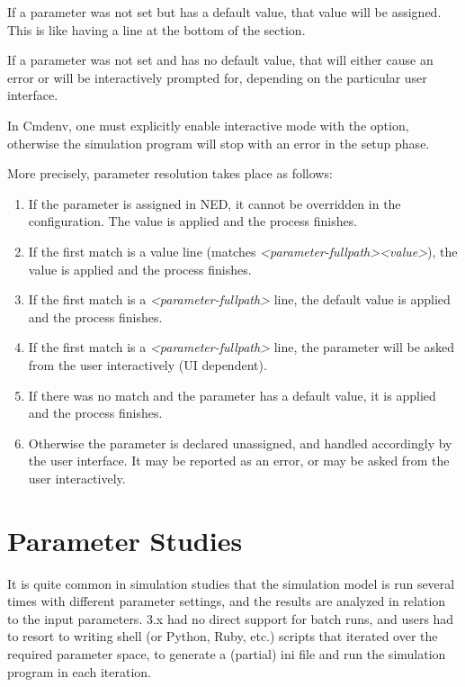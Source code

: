 If a parameter was not set but has a default value, that value will be
assigned. This is like having a  line at the
bottom of the \ttt{[General]} section.

If a parameter was not set and has no default value, that will either
cause an error or will be interactively prompted for, depending
on the particular user interface.

\begin{note}
In Cmdenv, one must explicitly enable interactive mode with the
 option, otherwise the simulation
program will stop with an error in the setup phase.
\end{note}

More precisely, parameter resolution takes place as follows:

\begin{enumerate}
\item If the parameter is assigned in NED, it cannot be overridden in the
    configuration. The value is applied and the process finishes.
\item If the first match is a value line (matches
    \textit{<parameter-fullpath>}\ttt{=}\textit{<value>}), the value is
    applied and the process finishes.
\item If the first match is a \textit{<parameter-fullpath>} line,
    the default value is applied and the process finishes.
\item If the first match is a \textit{<parameter-fullpath>} line,
    the parameter will be asked from the user interactively (UI dependent).
\item If there was no match and the parameter has a default value, it is applied
    and the process finishes.
\item Otherwise the parameter is declared unassigned, and handled accordingly
    by the user interface. It may be reported as an error, or may be
    asked from the user interactively.
\end{enumerate}


\section{Parameter Studies}
\label{sec:config-sim:parameter-studies}

It is quite common in simulation studies that the simulation model is
run several times with different parameter settings, and the results
are analyzed in relation to the input parameters. {\opp} 3.x had no
direct support for batch runs, and users had to resort to writing shell
(or Python, Ruby, etc.) scripts that iterated over the required
parameter space, to generate a (partial) ini file and run the
simulation program in each iteration.


